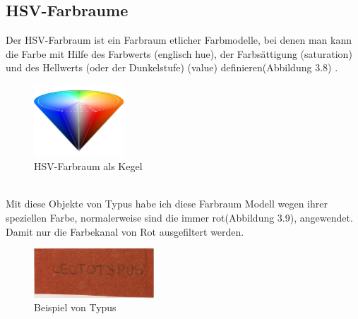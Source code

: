 \documentclass[10pt,a4paper]{report}
\begin{document}
\subsection{HSV-Farbraume}
Der HSV-Farbraum ist ein Farbraum etlicher Farbmodelle, bei denen man kann die Farbe mit Hilfe des Farbwerts (englisch hue), der Farbsättigung (saturation) und des Hellwerts (oder der Dunkelstufe) (value) definieren(Abbildung 3.8) \cite{7}. \\ 
\begin{figure}[htbp] 
	\centering
	\includegraphics[width=0.3\textwidth]{HSV_cone.png}
	\caption{HSV-Farbraum als Kegel}
	\label{fig:Bild 3.8}
\end{figure}\\
Mit diese Objekte von Typus habe ich diese Farbraum Modell wegen ihrer speziellen Farbe, normalerweise sind die immer rot(Abbildung 3.9), angewendet. Damit nur die Farbekanal von Rot ausgefiltert werden.\\
\begin{figure}[htbp] 
	\centering
	\includegraphics[width=0.4\textwidth]{test.jpg}
	\caption{Beispiel von Typus}
	\label{fig:Bild 3.9}
\end{figure}
\end{document}
